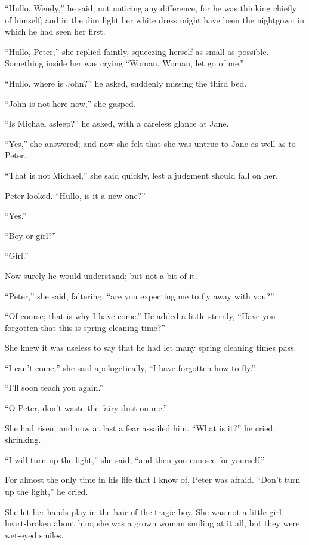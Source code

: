 ``Hullo, Wendy,'' he said, not noticing any difference, for he was
thinking chiefly of himself; and in the dim light her white dress might
have been the nightgown in which he had seen her first.

``Hullo, Peter,'' she replied faintly, squeezing herself as small as
possible. Something inside her was crying ``Woman, Woman, let go of me.''

``Hullo, where is John?'' he asked, suddenly missing the third bed.

``John is not here now,'' she gasped.

``Is Michael asleep?'' he asked, with a careless glance at Jane.

``Yes,'' she answered; and now she felt that she was untrue to Jane as
well as to Peter.

``That is not Michael,'' she said quickly, lest a judgment should fall on
her.

Peter looked. ``Hullo, is it a new one?''

``Yes.''

``Boy or girl?''

``Girl.''

Now surely he would understand; but not a bit of it.

``Peter,'' she said, faltering, ``are you expecting me to fly away with
you?''

``Of course; that is why I have come.'' He added a little sternly, ``Have
you forgotten that this is spring cleaning time?''

She knew it was useless to say that he had let many spring cleaning
times pass.

``I can't come,'' she said apologetically, ``I have forgotten how to fly.''

``I'll soon teach you again.''

``O Peter, don't waste the fairy dust on me.''

She had risen; and now at last a fear assailed him. ``What is it?'' he
cried, shrinking.

``I will turn up the light,'' she said, ``and then you can see for
yourself.''

For almost the only time in his life that I know of, Peter was afraid.
``Don't turn up the light,'' he cried.

She let her hands play in the hair of the tragic boy. She was not a
little girl heart-broken about him; she was a grown woman smiling at it
all, but they were wet-eyed smiles.

